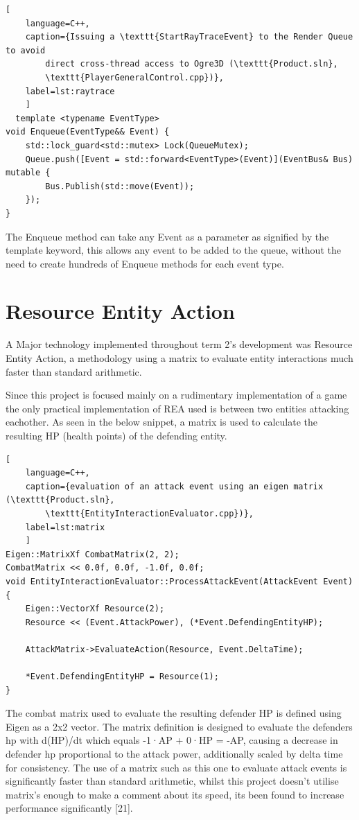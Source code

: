 \documentclass[]{final_report}
\begin{document}
\begin{lstlisting}[
	language=C++,
	caption={Issuing a \texttt{StartRayTraceEvent} to the Render Queue to avoid 
		direct cross-thread access to Ogre3D (\texttt{Product.sln}, 
		\texttt{PlayerGeneralControl.cpp})},
	label=lst:raytrace
	]
  template <typename EventType>
void Enqueue(EventType&& Event) {
	std::lock_guard<std::mutex> Lock(QueueMutex);
	Queue.push([Event = std::forward<EventType>(Event)](EventBus& Bus) mutable {
		Bus.Publish(std::move(Event));
	});
} 

\end{lstlisting}

The Enqueue method can take any Event as a parameter as signified by the template keyword, this allows any event to be added to the queue, without the need to create hundreds of Enqueue methods for each event type.

\section {Resource Entity Action}

A Major technology implemented throughout term 2's development was Resource Entity Action, a methodology using a matrix to evaluate entity interactions much faster than standard arithmetic.

Since this project is focused mainly on a rudimentary implementation of a game the only practical implementation of REA used is between two entities attacking eachother. As seen in the below snippet, a matrix is used to calculate the resulting HP (health points) of the defending entity.

\begin{lstlisting}[
	language=C++,
	caption={evaluation of an attack event using an eigen matrix (\texttt{Product.sln}, 
		\texttt{EntityInteractionEvaluator.cpp})},
	label=lst:matrix
	]
Eigen::MatrixXf CombatMatrix(2, 2);
CombatMatrix << 0.0f, 0.0f, -1.0f, 0.0f;
void EntityInteractionEvaluator::ProcessAttackEvent(AttackEvent Event) {
	Eigen::VectorXf Resource(2);
	Resource << (Event.AttackPower), (*Event.DefendingEntityHP);
	
	AttackMatrix->EvaluateAction(Resource, Event.DeltaTime);
	
	*Event.DefendingEntityHP = Resource(1);
}
\end{lstlisting}

The combat matrix used to evaluate the resulting defender HP is defined using Eigen as a 2x2 vector. The matrix definition is designed to evaluate the defenders hp with d(HP)/dt which equals -1·AP + 0·HP = -AP, causing a decrease in defender hp proportional to the attack power, additionally scaled by delta time for consistency. The use of a matrix such as this one to evaluate attack events is significantly faster than standard arithmetic, whilst this project doesn't utilise matrix's enough to make a comment about its speed, its been found to increase performance significantly [21].
\end{document}
